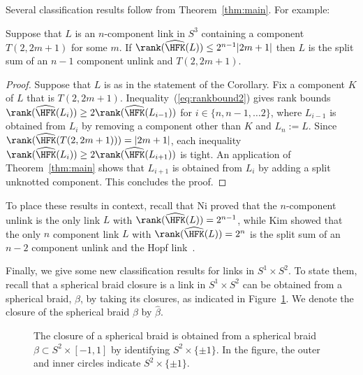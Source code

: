 \documentclass{amsart}
\theoremstyle{definition}
\theoremstyle{remark}
\numberwithin{equation}{section}
\begin{document}
 Several classification results follow from Theorem~\ref{thm:main}. For example:

\begin{corollary}
    Suppose that $L$ is an $n$-component link in $S^3$ containing a component $T(2,2m+1)$ for some $m$. If $\rank(\widehat{\HFK}(L))\leq 2^{n-1}|2m+1|$ then $L$ is the split sum of an $n-1$ component unlink and $T(2,2m+1)$.
\end{corollary}
\begin{proof}
    
Suppose that $L$ is as in the statement of the Corollary. Fix a component $K$ of $L$ that is $T(2,2m+1)$. Inequality~(\ref{eq:rankbound2}) gives rank bounds $\rank(\widehat{\HFK}(L_i))\geq 2\rank(\widehat{\HFK}(L_{i-1}))$ for $i\in\{n,n-1,\dots 2\}$, where $L_{i-1}$ is obtained from $L_{i}$ by removing a component other than $K$ and $L_n:=L$.  Since $\rank(\widehat{\HFK}(T(2,2m+1)))=|2m+1|$, each inequality $\rank(\widehat{\HFK}(L_i))\geq 2\rank(\widehat{\HFK}(L_{i+1}))$ is tight. An application of Theorem~\ref{thm:main} shows that $L_{i+1}$ is obtained from $L_i$ by adding a split unknotted component. This concludes the proof.\end{proof}

 To place these results in context, recall that Ni proved that the $n$-component unlink is the only link $L$ with ${\rank(\widehat{\HFK}(L))=2^{n-1}}$\cite[Proposition 1.4]{ni2014homological}, while Kim showed that the only $n$ component link $L$ with $\rank(\widehat{\HFK}(L))=2^{n}$ is the split sum of an $n-2$ component unlink and the Hopf link~\cite[Theorem 1]{kim2020links}.



Finally, we give some new classification results for links in $S^1\times S^2$. To state them, recall that a spherical braid closure is a link in $S^1\times S^2$ can be obtained from a spherical braid, $\beta$, by taking its closures, as indicated in Figure~\ref{fig:sphericalbraidclosure}. We denote the closure of the spherical braid $\beta$ by $\widehat{\beta}$.

 \begin{figure}[h]
    \centering

 


    \caption{The closure of a spherical braid is obtained from a spherical braid $\beta\subset S^2\times[-1,1]$ by identifying $S^2\times\{\pm 1\}$. In the figure, the outer and inner circles indicate $S^2\times\{\pm 1\}$.}
    \label{fig:sphericalbraidclosure}
\end{figure}
\end{document}
